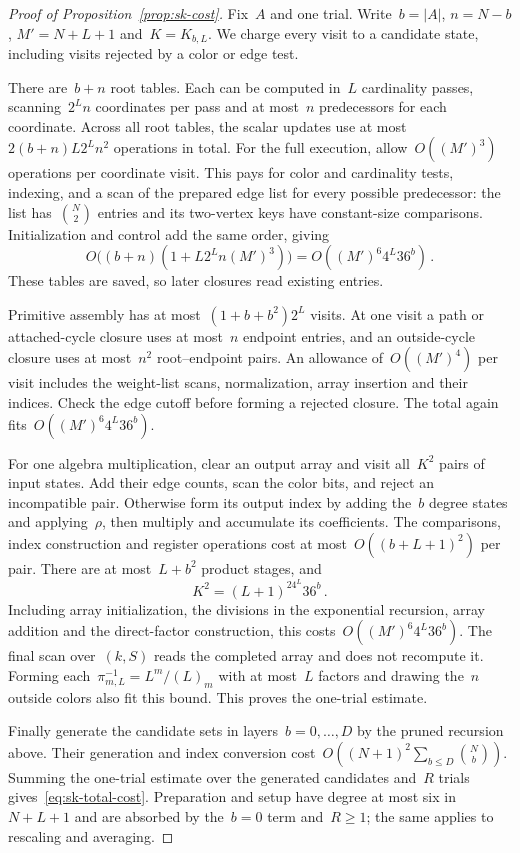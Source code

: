 \documentclass[10pt]{article}
\theoremstyle{plain}
\theoremstyle{definition}
\theoremstyle{remark}
\begin{document}
\label{app:sk-cost}
\begin{proof}[Proof of Proposition~\ref{prop:sk-cost}]
Fix~$A$ and one trial. Write~$b=|A|$, $n=N-b$, $M'=N+L+1$ and~$K=K_{b,L}$. We charge every visit to a candidate state, including visits rejected by a color or edge test.

There are~$b+n$ root tables. Each can be computed in~$L$ cardinality passes, scanning~$2^Ln$ coordinates per pass and at most~$n$ predecessors for each coordinate. Across all root tables, the scalar updates use at most~$2(b+n)L2^Ln^2$ operations in total. For the full execution, allow~$O((M')^3)$ operations per coordinate visit. This pays for color and cardinality tests, indexing, and a scan of the prepared edge list for every possible predecessor: the list has~$\binom N2$ entries and its two-vertex keys have constant-size comparisons. Initialization and control add the same order, giving
\begin{equation*}
 O\bigl((b+n)(1+L2^Ln(M')^3)\bigr)=O((M')^6 4^L36^b)\,.
\end{equation*}
These tables are saved, so later closures read existing entries.

Primitive assembly has at most~$(1+b+b^2)2^L$ visits. At one visit a path or attached-cycle closure uses at most~$n$ endpoint entries, and an outside-cycle closure uses at most~$n^2$ root--endpoint pairs. An allowance of~$O((M')^4)$ per visit includes the weight-list scans, normalization, array insertion and their indices. Check the edge cutoff before forming a rejected closure. The total again fits~$O((M')^6 4^L36^b)$.

For one algebra multiplication, clear an output array and visit all~$K^2$ pairs of input states. Add their edge counts, scan the color bits, and reject an incompatible pair. Otherwise form its output index by adding the~$b$ degree states and applying~$\rho$, then multiply and accumulate its coefficients. The comparisons, index construction and register operations cost at most~$O((b+L+1)^2)$ per pair. There are at most~$L+b^2$ product stages, and
\begin{equation*}
 K^2=(L+1)^24^L36^b\,.
\end{equation*}
Including array initialization, the divisions in the exponential recursion, array addition and the direct-factor construction, this costs~$O((M')^6 4^L36^b)$. The final scan over~$(k,S)$ reads the completed array and does not recompute it. Forming each~$\pi_{m,L}^{-1}=L^m/(L)_m$ with at most~$L$ factors and drawing the~$n$ outside colors also fit this bound. This proves the one-trial estimate.

Finally generate the candidate sets in layers~$b=0,\ldots,D$ by the pruned recursion above. Their generation and index conversion cost~$O((N+1)^2\sum_{b\le D}\binom Nb)$. Summing the one-trial estimate over the generated candidates and~$R$ trials gives~\eqref{eq:sk-total-cost}. Preparation and setup have degree at most six in~$N+L+1$ and are absorbed by the~$b=0$ term and~$R\ge1$; the same applies to rescaling and averaging.
\end{proof}
\end{document}
